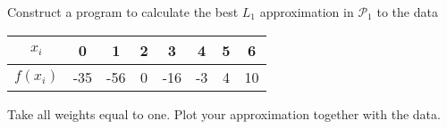 \begin{problem}
Construct a program to calculate the best $L_1$ approximation in $\mathcal{P}_1$ to the data
\begin{center}
\begin{tabular}{| c | c  c c c c c c | }
  \hline			
  $x_i$ & 0 & 1 & 2 & 3 &4 & 5 & 6 \\
  \hline
  $f(x_i)$ & -35 & -56 & 0 & -16 & -3 & 4 & 10 \\
  \hline  
\end{tabular}
\end{center}
Take all weights equal to one. Plot your approximation together with the data.
\end{problem}


\begin{solution}

\end{solution}

